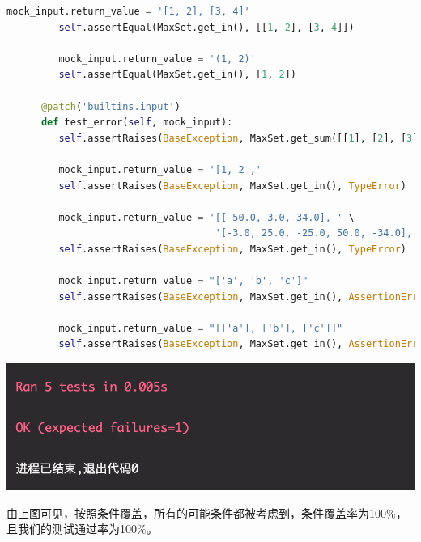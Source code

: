 \documentclass{article}
\begin{document}
\begin{lstlisting}[language = python]
         mock_input.return_value = '[1, 2], [3, 4]'
         self.assertEqual(MaxSet.get_in(), [[1, 2], [3, 4]])

         mock_input.return_value = '(1, 2)'
         self.assertEqual(MaxSet.get_in(), [1, 2])

      @patch('builtins.input')
      def test_error(self, mock_input):
         self.assertRaises(BaseException, MaxSet.get_sum([[1], [2], [3]]), TypeError)

         mock_input.return_value = '[1, 2 ,'
         self.assertRaises(BaseException, MaxSet.get_in(), TypeError)

         mock_input.return_value = '[[-50.0, 3.0, 34.0], ' \
                                    '[-3.0, 25.0, -25.0, 50.0, -34.0], [-8.0, 9.0, 7.0, -31.0, -2.0]])'
         self.assertRaises(BaseException, MaxSet.get_in(), TypeError)

         mock_input.return_value = "['a', 'b', 'c']"
         self.assertRaises(BaseException, MaxSet.get_in(), AssertionError)

         mock_input.return_value = "[['a'], ['b'], ['c']]"
         self.assertRaises(BaseException, MaxSet.get_in(), AssertionError)
\end{lstlisting}
\begin{center}
   \includegraphics[scale = 1]{31.png}
\end{center}
由上图可见，按照条件覆盖，所有的可能条件都被考虑到，条件覆盖率为100\%，且我们的测试通过率为100\%。
\end{document}

